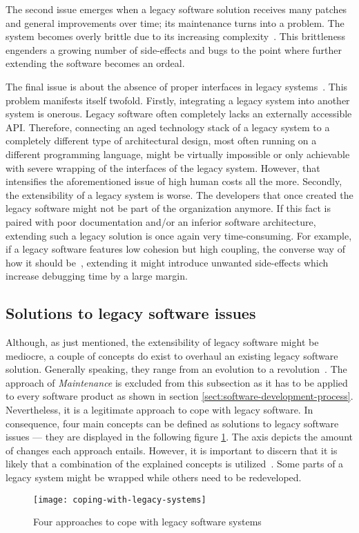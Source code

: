 \documentclass[12pt,a4paper]{report}
\begin{document}
The second issue emerges when a legacy software solution receives many
patches and general improvements over time; its maintenance
turns into a problem. The system becomes overly brittle due to its
increasing complexity~\cite{seacord-modernizing-legacy, tilley-perspectives-reengineering}.
This brittleness engenders a growing number of side-effects and bugs
to the point where further extending the software becomes an ordeal.

The final issue is about the absence of proper interfaces
in legacy systems~\cite{bisbal-legacy-issues}. This problem manifests itself twofold.
Firstly, integrating a legacy system into another system is onerous.
Legacy software often completely lacks an externally accessible API.
Therefore, connecting an aged technology stack of a legacy system to a completely
different type of architectural design, most often running on a different programming language,
might be virtually impossible or only achievable with severe wrapping
of the interfaces of the legacy system. However, that intensifies the aforementioned
issue of high human costs all the more.
Secondly, the extensibility of a legacy system is worse.
The developers that once created the legacy software might not be part of the
organization anymore. If this fact is paired with poor documentation and/or
an inferior software architecture, extending such a legacy solution is once again
very time-consuming. For example, if a legacy software features
low cohesion but high coupling, the converse way of how it should be~\cn,
extending it might introduce unwanted side-effects which increase debugging
time by a large margin.


\subsection{Solutions to legacy software issues}

Although, as just mentioned, the extensibility of legacy software might be mediocre,
a couple of concepts do exist to overhaul an existing legacy software solution.
Generally speaking, they range from an evolution to a revolution~\cite{bisbal-legacy-issues}.
The approach of \textit{Maintenance} is excluded from this subsection as it
has to be applied to every software product as shown in section \ref{sect:software-development-process}.
Nevertheless, it is a legitimate approach to cope with legacy software.
In consequence, four main concepts can be defined as solutions to legacy software issues ---
they are displayed in the following figure \ref{fig:coping-legacy}.
The axis depicts the amount of changes each approach entails.
However, it is important to discern that it is likely that a combination of
the explained concepts is utilized~\cite{bisbal-legacy-issues}.
Some parts of a legacy system might be wrapped while others need to be redeveloped.
\begin{figure}[htbp]
\centering
\texttt{[image: coping-with-legacy-systems]}
\caption{Four approaches to cope with legacy software systems~\cite{bisbal-legacy-issues}}
\label{fig:coping-legacy}
\end{figure}
\end{document}
